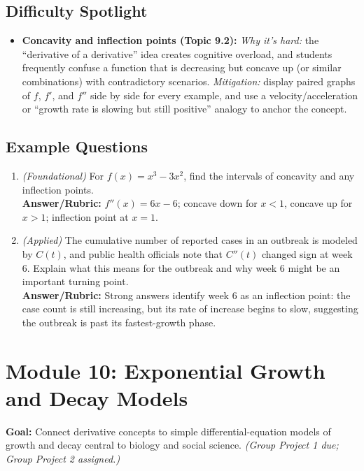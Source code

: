\documentclass{article}
\begin{document}
\subsection*{Difficulty Spotlight}
\begin{itemize}[leftmargin=*]
  \item \textbf{Concavity and inflection points (Topic 9.2):} \textit{Why it's hard:} the ``derivative of a derivative'' idea creates cognitive overload, and students frequently confuse a function that is decreasing but concave up (or similar combinations) with contradictory scenarios. \textit{Mitigation:} display paired graphs of $f$, $f'$, and $f''$ side by side for every example, and use a velocity/acceleration or ``growth rate is slowing but still positive'' analogy to anchor the concept.
\end{itemize}

\subsection*{Example Questions}
\begin{enumerate}[leftmargin=*]
  \item \textit{(Foundational)} For $f(x) = x^3 - 3x^2$, find the intervals of concavity and any inflection points. \\
  \textbf{Answer/Rubric:} $f''(x) = 6x-6$; concave down for $x<1$, concave up for $x>1$; inflection point at $x=1$.
  \item \textit{(Applied)} The cumulative number of reported cases in an outbreak is modeled by $C(t)$, and public health officials note that $C''(t)$ changed sign at week 6. Explain what this means for the outbreak and why week 6 might be an important turning point. \\
  \textbf{Answer/Rubric:} Strong answers identify week 6 as an inflection point: the case count is still increasing, but its rate of increase begins to slow, suggesting the outbreak is past its fastest-growth phase.
\end{enumerate}


\section{Module 10: Exponential Growth and Decay Models}
\textbf{Goal:} Connect derivative concepts to simple differential-equation models of growth and decay central to biology and social science. \textit{(Group Project 1 due; Group Project 2 assigned.)}
\end{document}

